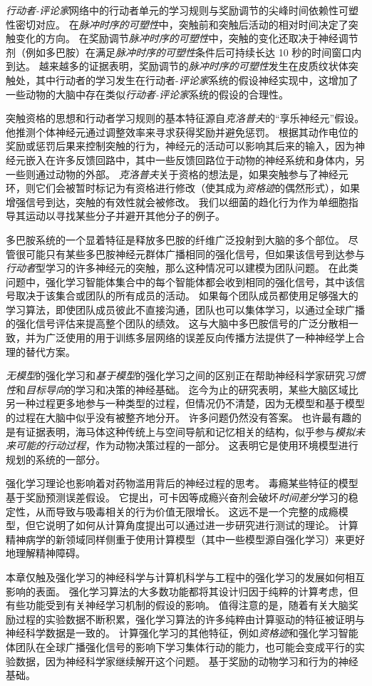 \textit{行动者-评论家}网络中的行动者单元的学习规则与奖励调节的尖峰时间依赖性可塑性密切对应。
在\textit{脉冲时序的可塑性}中，突触前和突触后活动的相对时间决定了突触变化的方向。
在奖励调节\textit{脉冲时序的可塑性}中，突触的变化还取决于神经调节剂（例如多巴胺）在满足\textit{脉冲时序的可塑性}条件后可持续长达 10 秒的时间窗口内到达。
越来越多的证据表明，奖励调节的\textit{脉冲时序的可塑性}发生在皮质纹状体突触处，其中行动者的学习发生在行动者-\textit{评论家}系统的假设神经实现中，这增加了一些动物的大脑中存在类似\textit{行动者-评论家}系统的假设的合理性。


突触资格的思想和行动者学习规则的基本特征源自\textit{克洛普夫}的“享乐神经元”假设\cite{klopf1972brain,klopf1982hedonistic}。
他推测个体神经元通过调整效率来寻求获得奖励并避免惩罚。
根据其动作电位的奖励或惩罚后果来控制突触的行为，神经元的活动可以影响其后来的输入，因为神经元嵌入在许多反馈回路中，其中一些反馈回路位于动物的神经系统和身体内，另一些则通过动物的外部。
\textit{克洛普夫}关于资格的想法是，如果突触参与了神经元环，则它们会被暂时标记为有资格进行修改（使其成为\textit{资格迹}的偶然形式），如果增强信号到达，突触的有效性就会被修改。
我们以细菌的趋化行为作为单细胞指导其运动以寻找某些分子并避开其他分子的例子。


多巴胺系统的一个显着特征是释放多巴胺的纤维广泛投射到大脑的多个部位。
尽管很可能只有某些多巴胺神经元群体广播相同的强化信号，但如果该信号到达参与\textit{行动者}型学习的许多神经元的突触，那么这种情况可以建模为团队问题。
在此类问题中，强化学习智能体集合中的每个智能体都会收到相同的强化信号，其中该信号取决于该集合或团队的所有成员的活动。
如果每个团队成员都使用足够强大的学习算法，即使团队成员彼此不直接沟通，团队也可以集体学习，以通过全球广播的强化信号评估来提高整个团队的绩效。
这与大脑中多巴胺信号的广泛分散相一致，并为广泛使用的用于训练多层网络的误差反向传播方法提供了一种神经学上合理的替代方案。


\textit{无模型}的强化学习和\textit{基于模型}的强化学习之间的区别正在帮助神经科学家研究\textit{习惯性}和\textit{目标导向}的学习和决策的神经基础。
迄今为止的研究表明，某些大脑区域比另一种过程更多地参与一种类型的过程，但情况仍不清楚，因为无模型和基于模型的过程在大脑中似乎没有被整齐地分开。
许多问题仍然没有答案。
也许最有趣的是有证据表明，海马体这种传统上与空间导航和记忆相关的结构，似乎参与\textit{模拟未来可能的行动过程}，作为动物决策过程的一部分。
这表明它是使用环境模型进行规划的系统的一部分。


强化学习理论也影响着对药物滥用背后的神经过程的思考。
毒瘾某些特征的模型基于奖励预测误差假设。
它提出，可卡因等成瘾兴奋剂会破坏\textit{时间差分}学习的稳定性，从而导致与吸毒相关的行为价值无限增长。
这远不是一个完整的成瘾模型，但它说明了如何从计算角度提出可以通过进一步研究进行测试的理论。
计算精神病学的新领域同样侧重于使用计算模型（其中一些模型源自强化学习）来更好地理解精神障碍。



本章仅触及强化学习的神经科学与计算机科学与工程中的强化学习的发展如何相互影响的表面。
强化学习算法的大多数功能都将其设计归因于纯粹的计算考虑，但有些功能受到有关神经学习机制的假设的影响。
值得注意的是，随着有关大脑奖励过程的实验数据不断积累，强化学习算法的许多纯粹由计算驱动的特征被证明与神经科学数据是一致的。
计算强化学习的其他特征，例如\textit{资格迹}和强化学习智能体团队在全球广播强化信号的影响下学习集体行动的能力，也可能会变成平行的实验数据，因为神经科学家继续解开这个问题。
基于奖励的动物学习和行为的神经基础。








